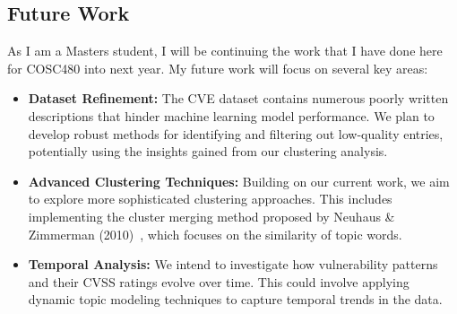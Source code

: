 \documentclass[12pt]{article}
\begin{document}





\subsection{Future Work}

As I am a Masters student, I will be continuing the work that I have done here for COSC480 into next
year. My future work will focus on several key areas:

\begin{itemize}

	\item \textbf{Dataset Refinement:} The CVE dataset contains numerous poorly written descriptions
	      that hinder machine learning model performance. We plan to develop robust methods for
	      identifying and filtering out low-quality entries, potentially using the insights gained
	      from our clustering analysis.

	\item \textbf{Advanced Clustering Techniques:} Building on our current work, we aim to explore
	      more sophisticated clustering approaches. This includes implementing the cluster merging
	      method proposed by Neuhaus \& Zimmerman (2010)~\cite{cve_topic_modelling}, which focuses on
	      the similarity of topic words.

	\item \textbf{Temporal Analysis:} We intend to investigate how vulnerability patterns and their
	      CVSS ratings evolve over time. This could involve applying dynamic topic modeling techniques
	      to capture temporal trends in the data.

\end{itemize}
\end{document}
